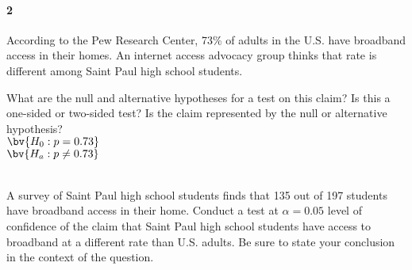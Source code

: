 \documentclass{article}
\begin{document}
\begin{flushleft}
\paragraph{2} According to the Pew Research Center, 73\% of adults in the U.S. have broadband access in their homes. An internet access advocacy group thinks that rate is different among Saint Paul high school students.
\begin{enumalpha}
\item What are the null and alternative hypotheses for a test on this claim? Is this a one-sided or two-sided test? Is the claim represented by the null or alternative hypothesis?\\
\medskip
$\bv{H_0: p = 0.73}$\\
$\bv{H_a: p \ne 0.73}$\\
\\
\vspace{.5in}
\item A survey of Saint Paul high school students finds that 135 out of 197 students have broadband access in their home. Conduct a test at $\alpha=0.05$ level of confidence of the claim that Saint Paul high school students have access to broadband at a different rate than U.S. adults. Be sure to state your conclusion in the context of the question.\\
\medskip
{}

\end{enumalpha}

\newpage

\end{flushleft}
\end{document}
